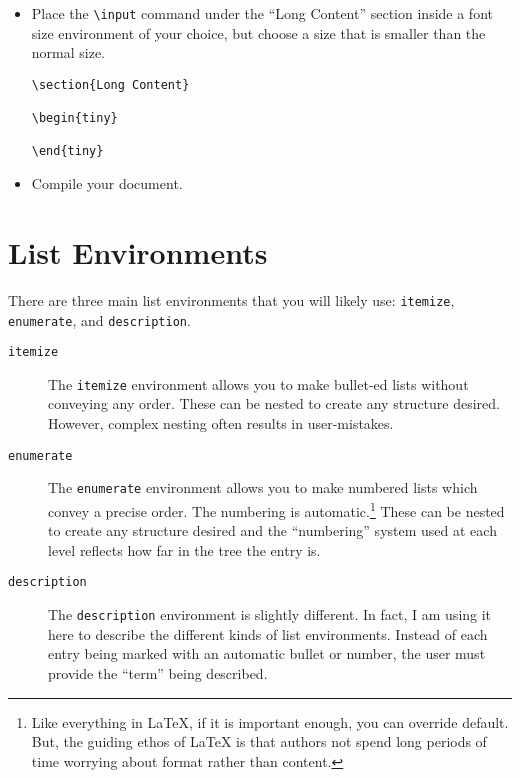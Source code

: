 \begin{itemize}

\item Place the \texttt{\textbackslash input} command under the ``Long Content''
  section inside a font size environment of your choice, but choose a size that
  is smaller than the normal size.

    \begin{lstlisting}
\section{Long Content}

\begin{tiny}
  
\end{tiny}
     \end{lstlisting}

  \item Compile your document.

\end{itemize}

\section{List Environments}

There are three main list environments that you will likely use:
\texttt{itemize}, \texttt{enumerate}, and \texttt{description}.

\begin{description}

\item[\texttt{itemize}] The \texttt{itemize} environment allows you to make
  bullet-ed lists without conveying any order. These can be nested to create any
  structure desired. However, complex nesting often results in user-mistakes.

\item[\texttt{enumerate}] The \texttt{enumerate} environment allows you to make
  numbered lists which convey a precise order. The numbering is
  automatic.\footnote{Like everything in \LaTeX{}, if it is important enough,
    you can override default. But, the guiding ethos of \LaTeX{} is that authors
    not spend long periods of time worrying about format rather than content.}
  These can be nested to create any structure desired and the ``numbering''
  system used at each level reflects how far in the tree the entry is.

\item[\texttt{description}] The \texttt{description} environment is slightly
  different. In fact, I am using it here to describe the different kinds of list
  environments. Instead of each entry being marked with an automatic bullet or
  number, the user must provide the ``term'' being described.
\end{description}

